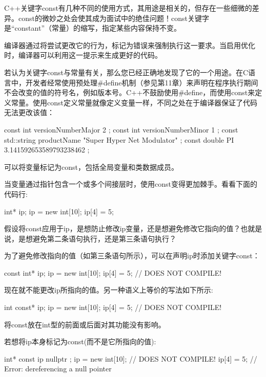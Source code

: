 C++关键字const有几种不同的使用方式，其用途是相关的，但存在一些细微的差异。const的微妙之处会使其成为面试中的绝佳问题！const关键字是“constant”（常量）的缩写，指定某些内容保持不变。

编译器通过将尝试更改它的行为，标记为错误来强制执行这一要求。当启用优化时，编译器可以利用这一提示来生成更好的代码。


若认为关键字const与常量有关，那么您已经正确地发现了它的一个用途。在C语言中，开发者经常使用预处理\#define机制（参见第11章）来声明在程序执行期间不会改变的值的符号名，例如版本号。C++不鼓励使用\#define，而使用const来定义常量。使用const定义常量就像定义变量一样，不同之处在于编译器保证了代码无法更改该值：

\begin{cpp}
const int versionNumberMajor { 2 };
const int versionNumberMinor { 1 };
const std::string productName { "Super Hyper Net Modulator" };
const double PI { 3.141592653589793238462 };
\end{cpp}

可以将变量标记为const，包括全局变量和类数据成员。


当变量通过指针包含一个或多个间接层时，使用const变得更加棘手。看看下面的代码行:

\begin{cpp}
int* ip;
ip = new int[10];
ip[4] = 5;
\end{cpp}

假设将const应用于ip，是想防止修改ip变量，还是想避免修改它指向的值？也就是说，是想避免第二条语句执行，还是第三条语句执行？

为了避免修改指向的值（如第三条语句所示），可以在声明ip时添加关键字const：

\begin{cpp}
const int* ip;
ip = new int[10];
ip[4] = 5; // DOES NOT COMPILE!
\end{cpp}

现在就不能更改ip所指向的值。另一种语义上等价的写法如下所示:

\begin{cpp}
int const* ip;
ip = new int[10];
ip[4] = 5; // DOES NOT COMPILE!
\end{cpp}

将const放在int型的前面或后面对其功能没有影响。

若想将ip本身标记为const(而不是它所指向的值):

\begin{cpp}
int* const ip { nullptr };
ip = new int[10]; // DOES NOT COMPILE!
ip[4] = 5; // Error: dereferencing a null pointer
\end{cpp}

